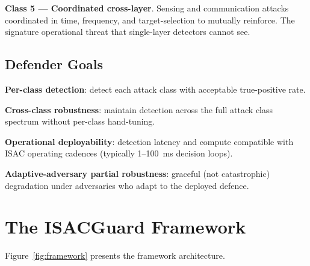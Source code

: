 \documentclass[sigconf,nonacm]{acmart}
\begin{document}
\textbf{Class 5 --- Coordinated cross-layer}. Sensing and
communication attacks coordinated in time, frequency, and
target-selection to mutually reinforce. The signature operational
threat that single-layer detectors cannot see.

\subsection{Defender Goals}

\textbf{Per-class detection}: detect each attack class with
acceptable true-positive rate.

\textbf{Cross-class robustness}: maintain detection across
the full attack class spectrum without per-class
hand-tuning.

\textbf{Operational deployability}: detection latency and
compute compatible with ISAC operating cadences (typically
1--100~ms decision loops).

\textbf{Adaptive-adversary partial robustness}: graceful
(not catastrophic) degradation under adversaries who adapt to
the deployed defence.

\section{The ISACGuard Framework}

Figure~\ref{fig:framework} presents the framework architecture.
\end{document}
